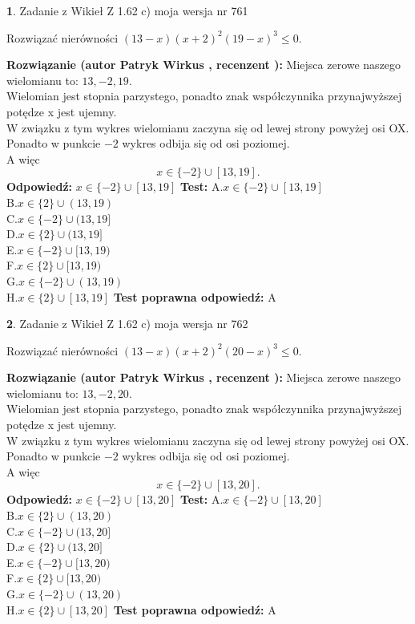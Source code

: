 \documentclass[12pt, a4paper]{article}
\theoremstyle{definition} %
\newtheorem{zad}{}
\newcommand{\zadStart}[1]{\begin{zad}#1\newline}
\newcommand{\zadStop}{\end{zad}}
\newcommand{\rozwStart}[2]{\noindent \textbf{Rozwiązanie (autor #1 , recenzent #2): }\newline}
\newcommand{\rozwStop}{\newline}
\newcommand{\odpStart}{\noindent \textbf{Odpowiedź:}\newline}
\newcommand{\odpStop}{\newline}
\newcommand{\testStart}{\noindent \textbf{Test:}\newline}
\newcommand{\testStop}{\newline}
\newcommand{\kluczStart}{\noindent \textbf{Test poprawna odpowiedź:}\newline}
\newcommand{\kluczStop}{\newline}
\begin{document}
\zadStart{Zadanie z Wikieł Z 1.62 c) moja wersja nr 761}

Rozwiązać nierówności $(13-x)(x+2)^{2}(19-x)^{3}\le0$.
\zadStop
\rozwStart{Patryk Wirkus}{}
Miejsca zerowe naszego wielomianu to: $13, -2, 19$.\\
Wielomian jest stopnia parzystego, ponadto znak współczynnika przy\linebreak najwyższej potędze x jest ujemny.\\ W związku z tym wykres wielomianu zaczyna się od lewej strony powyżej osi OX.\\
Ponadto w punkcie $-2$ wykres odbija się od osi poziomej.\\
A więc $$x \in \{-2\} \cup [13,19].$$
\rozwStop
\odpStart
$x \in \{-2\} \cup [13,19]$
\odpStop
\testStart
A.$x \in \{-2\} \cup [13,19]$\\
B.$x \in \{2\} \cup (13,19)$\\
C.$x \in \{-2\} \cup (13,19]$\\
D.$x \in \{2\} \cup (13,19]$\\
E.$x \in \{-2\} \cup [13,19)$\\
F.$x \in \{2\} \cup [13,19)$\\
G.$x \in \{-2\} \cup (13,19)$\\
H.$x \in \{2\} \cup [13,19]$
\testStop
\kluczStart
A
\kluczStop



\zadStart{Zadanie z Wikieł Z 1.62 c) moja wersja nr 762}

Rozwiązać nierówności $(13-x)(x+2)^{2}(20-x)^{3}\le0$.
\zadStop
\rozwStart{Patryk Wirkus}{}
Miejsca zerowe naszego wielomianu to: $13, -2, 20$.\\
Wielomian jest stopnia parzystego, ponadto znak współczynnika przy\linebreak najwyższej potędze x jest ujemny.\\ W związku z tym wykres wielomianu zaczyna się od lewej strony powyżej osi OX.\\
Ponadto w punkcie $-2$ wykres odbija się od osi poziomej.\\
A więc $$x \in \{-2\} \cup [13,20].$$
\rozwStop
\odpStart
$x \in \{-2\} \cup [13,20]$
\odpStop
\testStart
A.$x \in \{-2\} \cup [13,20]$\\
B.$x \in \{2\} \cup (13,20)$\\
C.$x \in \{-2\} \cup (13,20]$\\
D.$x \in \{2\} \cup (13,20]$\\
E.$x \in \{-2\} \cup [13,20)$\\
F.$x \in \{2\} \cup [13,20)$\\
G.$x \in \{-2\} \cup (13,20)$\\
H.$x \in \{2\} \cup [13,20]$
\testStop
\kluczStart
A
\kluczStop
\end{document}
